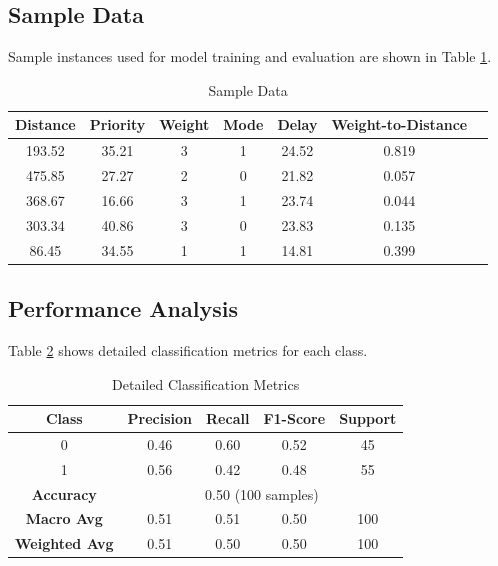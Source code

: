 \documentclass[conference]{IEEEtran}
\begin{document}
\subsection{Sample Data}
Sample instances used for model training and evaluation are shown in Table \ref{tab:sample}.
\begin{table}[htbp]
\caption{Sample Data}
\begin{center}
\begin{tabular}{|c|c|c|c|c|c|c|}
\hline
\textbf{Distance} & \textbf{Priority} & \textbf{Weight} & \textbf{Mode} & \textbf{Delay} & \textbf{Weight-to-Distance} \\
\hline
193.52 & 35.21 & 3 & 1 & 24.52 & 0.819 \\
\hline
475.85 & 27.27 & 2 & 0 & 21.82 & 0.057 \\
\hline
368.67 & 16.66 & 3 & 1 & 23.74 & 0.044 \\
\hline
303.34 & 40.86 & 3 & 0 & 23.83 & 0.135 \\
\hline
86.45 & 34.55 & 1 & 1 & 14.81 & 0.399 \\
\hline
\end{tabular}
\label{tab:sample}
\end{center}
\end{table}

\subsection{Performance Analysis}
Table \ref{tab:class_metrics} shows detailed classification metrics for each class.
\begin{table}[htbp]
\caption{Detailed Classification Metrics}
\begin{center}
\begin{tabular}{|c|c|c|c|c|}
\hline
\textbf{Class} & \textbf{Precision} & \textbf{Recall} & \textbf{F1-Score} & \textbf{Support} \\
\hline
0 & 0.46 & 0.60 & 0.52 & 45 \\
\hline
1 & 0.56 & 0.42 & 0.48 & 55 \\
\hline
\textbf{Accuracy} & \multicolumn{4}{c|}{0.50 (100 samples)} \\
\hline
\textbf{Macro Avg} & 0.51 & 0.51 & 0.50 & 100 \\
\hline
\textbf{Weighted Avg} & 0.51 & 0.50 & 0.50 & 100 \\
\hline
\end{tabular}
\label{tab:class_metrics}
\end{center}
\end{table}
\end{document}
